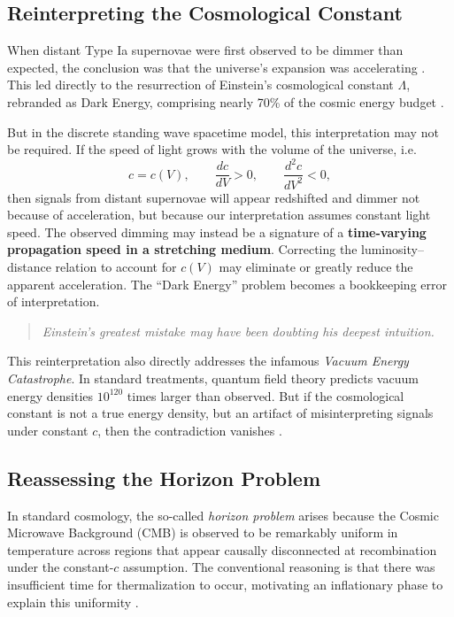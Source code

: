 \documentclass[12pt]{article}
\begin{document}
\subsection{Reinterpreting the Cosmological Constant}

When distant Type Ia supernovae were first observed to be dimmer than expected, the conclusion was that the universe’s expansion was accelerating \citep{perlmutter1999, riess1998}. This led directly to the resurrection of Einstein’s cosmological constant \( \Lambda \), rebranded as Dark Energy, comprising nearly 70\% of the cosmic energy budget \citep{planck2018}.

But in the discrete standing wave spacetime model, this interpretation may not be required. If the speed of light grows with the volume of the universe, i.e.
\begin{equation}
  c = c(V), \qquad \frac{dc}{dV} > 0, \qquad \frac{d^2c}{dV^2} < 0,
\end{equation}
then signals from distant supernovae will appear redshifted and dimmer not because of acceleration, but because our interpretation assumes constant light speed. The observed dimming may instead be a signature of a \textbf{time-varying propagation speed in a stretching medium}. Correcting the luminosity–distance relation to account for \(c(V)\) may eliminate or greatly reduce the apparent acceleration. The ``Dark Energy'' problem becomes a bookkeeping error of interpretation.

\begin{quote}
\textit{Einstein’s greatest mistake may have been doubting his deepest intuition.}
\end{quote}

This reinterpretation also directly addresses the infamous \textit{Vacuum Energy Catastrophe}. In standard treatments, quantum field theory predicts vacuum energy densities \(10^{120}\) times larger than observed. But if the cosmological constant is not a true energy density, but an artifact of misinterpreting signals under constant \(c\), then the contradiction vanishes \citep{weinberg1989}.

\subsection{Reassessing the Horizon Problem}

In standard cosmology, the so-called \emph{horizon problem} arises because the Cosmic Microwave Background (CMB) is observed to be remarkably uniform in temperature across regions that appear causally disconnected at recombination \cite{smoot1992} under the constant-$c$ assumption. The conventional reasoning is that there was insufficient time for thermalization to occur, motivating an inflationary phase to explain this uniformity \cite{liddle2000}.
\end{document}
